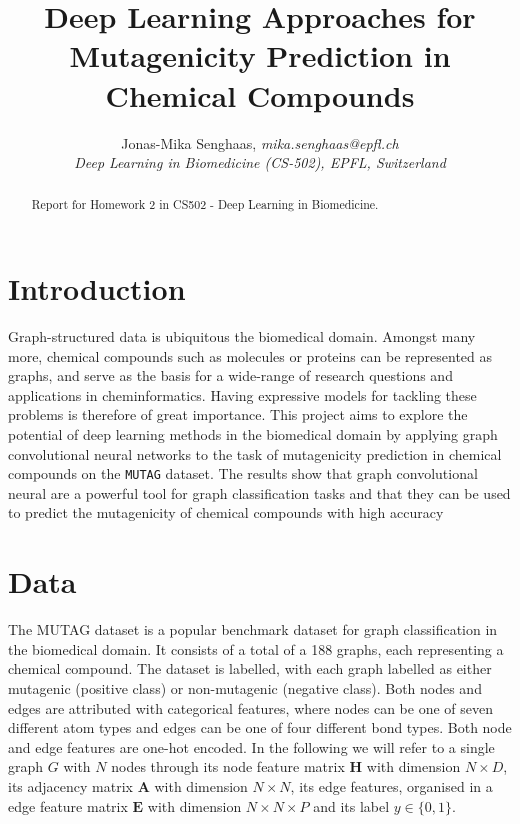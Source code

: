 \documentclass[10pt,conference,compsocconf]{IEEEtran}
\begin{document}
\title{Deep Learning Approaches for Mutagenicity Prediction in Chemical Compounds}

\author{
  Jonas-Mika Senghaas, \textit{mika.senghaas@epfl.ch} \\
  \textit{Deep Learning in Biomedicine (CS-502), EPFL, Switzerland}
}

\maketitle

\begin{abstract}
  Report for Homework 2 in CS502 - Deep Learning in Biomedicine.
\end{abstract}

\section{Introduction}

Graph-structured data is ubiquitous the biomedical domain. Amongst many more,
chemical compounds such as molecules or proteins can be represented as graphs,
and serve as the basis for a wide-range of research questions and applications
in cheminformatics. Having expressive models for tackling these problems is
therefore of great importance. This project aims to explore the potential of
deep learning methods in the biomedical domain by applying graph convolutional
neural networks to the task of mutagenicity prediction in chemical compounds
on the \texttt{MUTAG} dataset. The results show that graph convolutional
neural are a powerful tool for graph classification tasks and that they can be
used to predict the mutagenicity of chemical compounds with high accuracy


\section{Data}

The MUTAG dataset is a popular benchmark dataset for graph classification in the
biomedical domain. It consists of a total of a 188 graphs, each representing a
chemical compound. The dataset is labelled, with each graph labelled as either
mutagenic (positive class) or non-mutagenic (negative class). Both nodes and
edges are attributed with categorical features, where nodes can be one of seven 
different atom types and edges can be one of four different bond types. Both
node and edge features are one-hot encoded. In the following we will refer to a
single graph $G$ with $N$ nodes through its node feature matrix $\mathbf{H}$
with dimension $N \times D$, its adjacency matrix $\mathbf{A}$ with dimension
$N \times N$, its edge features, organised in a edge feature matrix $\mathbf{E}$
with dimension $N \times N \times P$ and its label $y \in \{0, 1\}$.
\end{document}
